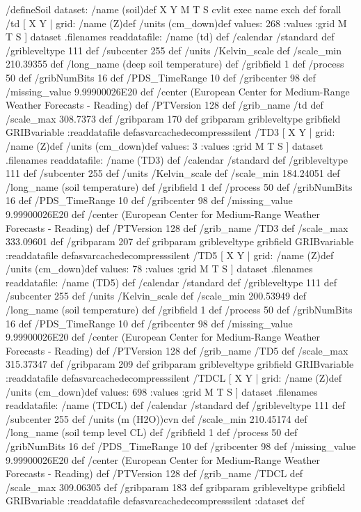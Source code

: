 \begin{ingrid}
/defineSoil {
dataset:
/name (soil)def
{ X Y M T S} cvlit { exec name exch def} forall
 /td{
[ X Y | grid:
/name (Z)def
/units (cm_down)def
values: 268 :values
:grid
 M T S ] dataset .filenames readdatafile:
/name (td) def
 /calendar /standard def
 /gribleveltype 111 def
 /subcenter 255 def
 /units /Kelvin_scale def
 /scale_min 210.39355 def
 /long_name (deep soil temperature) def
 /gribfield 1 def
 /process 50 def
 /gribNumBits 16 def
 /PDS_TimeRange 10 def
 /gribcenter 98 def
 /missing_value 9.99900026E20 def
 /center (European Center for Medium-Range Weather Forecasts - Reading) def
 /PTVersion 128 def
 /grib_name /td def
 /scale_max 308.7373 def
 /gribparam 170 def
 gribparam gribleveltype gribfield GRIBvariable
 :readdatafile
}defasvarcachedecompresssilent
 /TD3{
[ X Y | grid:
/name (Z)def
/units (cm_down)def
values: 3 :values
:grid
 M T S ] dataset .filenames readdatafile:
/name (TD3) def
 /calendar /standard def
 /gribleveltype 111 def
 /subcenter 255 def
 /units /Kelvin_scale def
 /scale_min 184.24051 def
 /long_name (soil temperature) def
 /gribfield 1 def
 /process 50 def
 /gribNumBits 16 def
 /PDS_TimeRange 10 def
 /gribcenter 98 def
 /missing_value 9.99900026E20 def
 /center (European Center for Medium-Range Weather Forecasts - Reading) def
 /PTVersion 128 def
 /grib_name /TD3 def
 /scale_max 333.09601 def
 /gribparam 207 def
 gribparam gribleveltype gribfield GRIBvariable
 :readdatafile
}defasvarcachedecompresssilent
 /TD5{
[ X Y | grid:
/name (Z)def
/units (cm_down)def
values: 78 :values
:grid
 M T S ] dataset .filenames readdatafile:
/name (TD5) def
 /calendar /standard def
 /gribleveltype 111 def
 /subcenter 255 def
 /units /Kelvin_scale def
 /scale_min 200.53949 def
 /long_name (soil temperature) def
 /gribfield 1 def
 /process 50 def
 /gribNumBits 16 def
 /PDS_TimeRange 10 def
 /gribcenter 98 def
 /missing_value 9.99900026E20 def
 /center (European Center for Medium-Range Weather Forecasts - Reading) def
 /PTVersion 128 def
 /grib_name /TD5 def
 /scale_max 315.37347 def
 /gribparam 209 def
 gribparam gribleveltype gribfield GRIBvariable
 :readdatafile
}defasvarcachedecompresssilent
 /TDCL{
[ X Y | grid:
/name (Z)def
/units (cm_down)def
values: 698 :values
:grid
 M T S ] dataset .filenames readdatafile:
/name (TDCL) def
 /calendar /standard def
 /gribleveltype 111 def
 /subcenter 255 def
 /units (m (H2O))cvn def
 /scale_min 210.45174 def
 /long_name (soil temp level CL) def
 /gribfield 1 def
 /process 50 def
 /gribNumBits 16 def
 /PDS_TimeRange 10 def
 /gribcenter 98 def
 /missing_value 9.99900026E20 def
 /center (European Center for Medium-Range Weather Forecasts - Reading) def
 /PTVersion 128 def
 /grib_name /TDCL def
 /scale_max 309.06305 def
 /gribparam 183 def
 gribparam gribleveltype gribfield GRIBvariable
 :readdatafile
}defasvarcachedecompresssilent
:dataset
} def
\end{ingrid}
